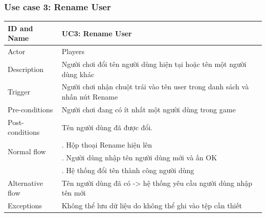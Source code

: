 \subsubsection{Use case 3: Rename User}
\begin{center}
	\begin{tabular}{|l|p{12cm}|}
		\hline
		ID and Name & UC3: Rename User \\
		\hline
		Actor  & Players \\
		\hline
		Description  & Người chơi đổi tên người dùng hiện tại hoặc tên một người dùng khác\\
		\hline
		Trigger  & Người chơi nhận chuột trái vào tên user trong danh sách và nhấn nút Rename\\
		\hline
		Pre-conditions & Người chơi đang có ít nhất một người dùng trong game \\
		\hline
		Post-conditions  & Tên người dùng đã được đổi.\\
		\hline
		\multirow{2}{*}{Normal flow}      &\qquad 1. Hộp thoại Rename hiện lên\\
		&\qquad 2. Người dùng nhập tên người dùng mới và ấn OK\\
		&\qquad 3. Hệ thống đổi tên thành công người dùng\\
		\hline
		Alternative flow  & Tên người dùng đã có -> hệ thống yêu cầu người dùng nhập tên mới\\
		\hline
		Exceptions  & Không thể lưu dữ liệu do không thể ghi vào tệp cần thiết\\
		\hline
	\end{tabular}
\end{center}
